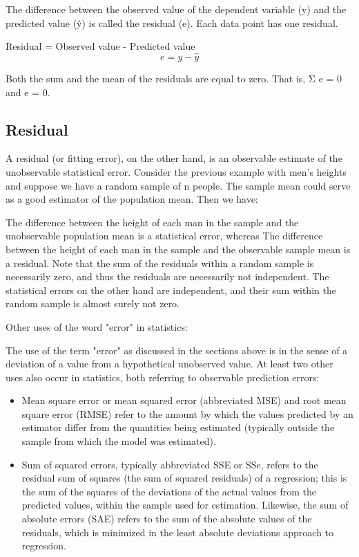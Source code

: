 \documentclass[12pt, a4paper]{report}
\theoremstyle{plain}
\theoremstyle{definition}
\theoremstyle{remark}
\begin{document}

The difference between the observed value of the dependent variable (y) and the predicted value (ŷ) is called the residual (e). Each data point has one residual.

Residual = Observed value - Predicted value 
\[e = y - \hat{y} \]

Both the sum and the mean of the residuals are equal to zero. That is, Σ e = 0 and e = 0.





\subsection{Residual}
A residual (or fitting error), on the other hand, is an observable estimate of the unobservable statistical error. Consider the previous example with men's heights and suppose we have a random sample of n people. The sample mean could serve as a good estimator of the population mean. Then we have:

The difference between the height of each man in the sample and the unobservable population mean is a statistical error, whereas
The difference between the height of each man in the sample and the observable sample mean is a residual.
Note that the sum of the residuals within a random sample is necessarily zero, and thus the residuals are necessarily not independent. The statistical errors on the other hand are independent, and their sum within the random sample is almost surely not zero.


Other uses of the word "error" in statistics: 

The use of the term "error" as discussed in the sections above is in the sense of a deviation of a value from a hypothetical unobserved value. At least two other uses also occur in statistics, both referring to observable prediction errors:

\begin{itemize}
	\item Mean square error or mean squared error (abbreviated MSE) and root mean square error (RMSE) refer to the amount by which the values predicted by an estimator differ from the quantities being estimated (typically outside the sample from which the model was estimated).
	
	\item 
	Sum of squared errors, typically abbreviated SSE or SSe, refers to the residual sum of squares (the sum of squared residuals) of a regression; this is the sum of the squares of the deviations of the actual values from the predicted values, within the sample used for estimation. Likewise, the sum of absolute errors (SAE) refers to the sum of the absolute values of the residuals, which is minimized in the least absolute deviations approach to regression.
	
\end{itemize}
\end{document}
